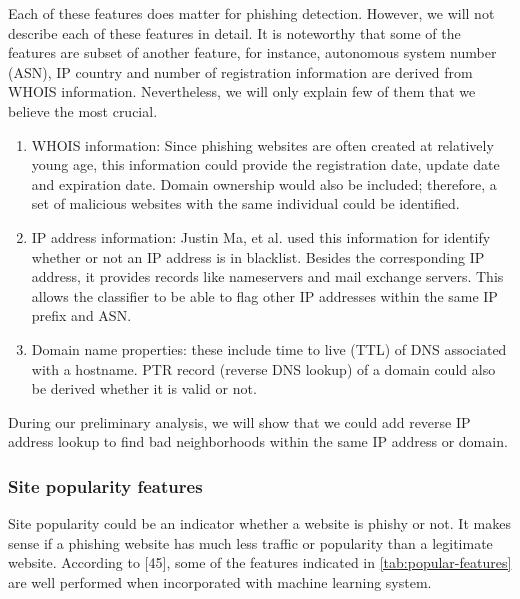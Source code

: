 Each of these features does matter for phishing detection. However,
we will not describe each of these features in detail. It is noteworthy
that some of the features are subset of another feature, for instance,
autonomous system number (ASN), IP country and number of registration
information are derived from WHOIS information. Nevertheless, we will
only explain few of them that we believe the most crucial. 
\begin{enumerate}
\item WHOIS information: Since phishing websites are often created at relatively
young age, this information could provide the registration date, update
date and expiration date. Domain ownership would also be included;
therefore, a set of malicious websites with the same individual could
be identified. 
\item IP address information: Justin Ma, et al. used this information for
identify whether or not an IP address is in blacklist. Besides the
corresponding IP address, it provides records like nameservers and
mail exchange servers. This allows the classifier to be able to flag
other IP addresses within the same IP prefix and ASN. 
\item Domain name properties: these include time to live (TTL) of DNS associated
with a hostname. PTR record (reverse DNS lookup) of a domain could
also be derived whether it is valid or not.
\end{enumerate}
During our preliminary analysis, we will show that we could add reverse
IP address lookup to find bad neighborhoods within the same IP address
or domain. 


\subsubsection{Site popularity features}

Site popularity could be an indicator whether a website is phishy
or not. It makes sense if a phishing website has much less traffic
or popularity than a legitimate website. According to {[}45{]}, some
of the features indicated in \autoref{tab:popular-features} are well
performed when incorporated with machine learning system. 

